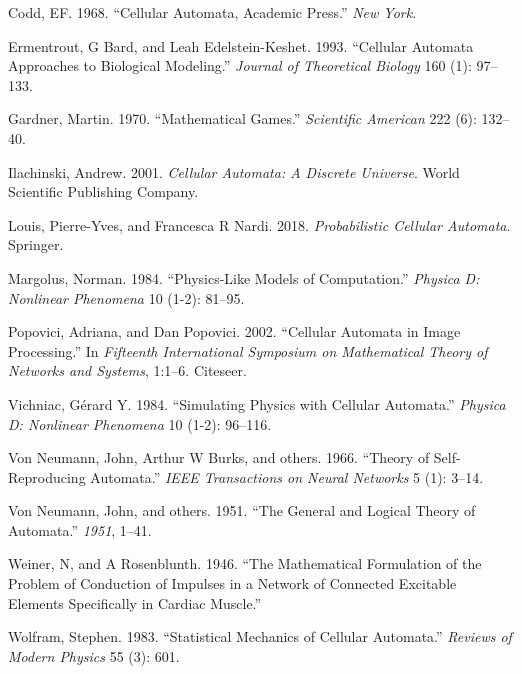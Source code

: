 \documentclass[
]{book}
\newlength{\cslhangindent}
\newenvironment{cslreferences}%
  {\setlength{\parindent}{0pt}%
  \everypar{\setlength{\hangindent}{\cslhangindent}}\ignorespaces}%
  {\par}
\begin{document}
\hypertarget{refs}{}
\begin{cslreferences}
\leavevmode\hypertarget{ref-codd1968cellular}{}%
Codd, EF. 1968. ``Cellular Automata, Academic Press.'' \emph{New York}.

\leavevmode\hypertarget{ref-ermentrout1993cellular}{}%
Ermentrout, G Bard, and Leah Edelstein-Keshet. 1993. ``Cellular Automata Approaches to Biological Modeling.'' \emph{Journal of Theoretical Biology} 160 (1): 97--133.

\leavevmode\hypertarget{ref-gardner1970mathematical}{}%
Gardner, Martin. 1970. ``Mathematical Games.'' \emph{Scientific American} 222 (6): 132--40.

\leavevmode\hypertarget{ref-ilachinski2001cellular}{}%
Ilachinski, Andrew. 2001. \emph{Cellular Automata: A Discrete Universe}. World Scientific Publishing Company.

\leavevmode\hypertarget{ref-louis2018probabilistic}{}%
Louis, Pierre-Yves, and Francesca R Nardi. 2018. \emph{Probabilistic Cellular Automata}. Springer.

\leavevmode\hypertarget{ref-margolus1984physics}{}%
Margolus, Norman. 1984. ``Physics-Like Models of Computation.'' \emph{Physica D: Nonlinear Phenomena} 10 (1-2): 81--95.

\leavevmode\hypertarget{ref-popovici2002cellular}{}%
Popovici, Adriana, and Dan Popovici. 2002. ``Cellular Automata in Image Processing.'' In \emph{Fifteenth International Symposium on Mathematical Theory of Networks and Systems}, 1:1--6. Citeseer.

\leavevmode\hypertarget{ref-vichniac1984simulating}{}%
Vichniac, Gérard Y. 1984. ``Simulating Physics with Cellular Automata.'' \emph{Physica D: Nonlinear Phenomena} 10 (1-2): 96--116.

\leavevmode\hypertarget{ref-von1966theory}{}%
Von Neumann, John, Arthur W Burks, and others. 1966. ``Theory of Self-Reproducing Automata.'' \emph{IEEE Transactions on Neural Networks} 5 (1): 3--14.

\leavevmode\hypertarget{ref-von1951general}{}%
Von Neumann, John, and others. 1951. ``The General and Logical Theory of Automata.'' \emph{1951}, 1--41.

\leavevmode\hypertarget{ref-weiner1946mathematical}{}%
Weiner, N, and A Rosenblunth. 1946. ``The Mathematical Formulation of the Problem of Conduction of Impulses in a Network of Connected Excitable Elements Specifically in Cardiac Muscle.''

\leavevmode\hypertarget{ref-wolfram1983statistical}{}%
Wolfram, Stephen. 1983. ``Statistical Mechanics of Cellular Automata.'' \emph{Reviews of Modern Physics} 55 (3): 601.
\end{cslreferences}
\end{document}
